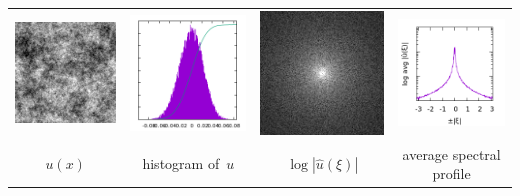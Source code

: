 \begin{tabular}{cccc}
	\includegraphics{KK-1.png} &
	\includegraphics{KK-1_h.png} &
	\includegraphics{KK-1_f.png} &
	\includegraphics{KK-1_p.png} \\
	$u(x)$ &
	histogram of~$u$ &
	$\log|\hat u(\xi)|$ &
	average spectral profile
\end{tabular}

